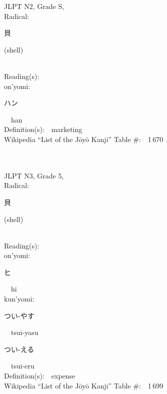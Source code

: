 \begin{multicols}{2}
{JLPT N2, Grade S, \\Radical:\ \ {\begin{CJK}{UTF8}{min} 貝 \end{CJK}} (shell) } \\
Reading(s):\ \ \\
{\hspace*{1em}}on'yomi:\ \ \\
{\hspace*{2em}}{\begin{CJK}{UTF8}{min} ハン \end{CJK}}\ \ han\ \ \\
Definition(s):\ \ marketing \\
Wikipedia ``List of the J\=oy\=o Kanji'' Table \#:\ \ 1\,670 \\
\ \ \\
{\fontsize{34pt}{40pt}  }\ \ \\  %
{JLPT N3, Grade 5, \\Radical:\ \ {\begin{CJK}{UTF8}{min} 貝 \end{CJK}} (shell) } \\
Reading(s):\ \ \\
{\hspace*{1em}}on'yomi:\ \ \\
{\hspace*{2em}}{\begin{CJK}{UTF8}{min} ヒ \end{CJK}}\ \ hi\ \ \\
{\hspace*{1em}}kun'yomi:\ \ \\
{\hspace*{2em}}{\begin{CJK}{UTF8}{min} つい-やす \end{CJK}}\ \ tsui-yasu\ \ \\
{\hspace*{2em}}{\begin{CJK}{UTF8}{min} つい-える \end{CJK}}\ \ tsui-eru\ \ \\
Definition(s):\ \ expense \\
Wikipedia ``List of the J\=oy\=o Kanji'' Table \#:\ \ 1\,699 \\
\ \ \\
{\fontsize{34pt}{40pt}  }\ \ \\  %

\end{multicols}

